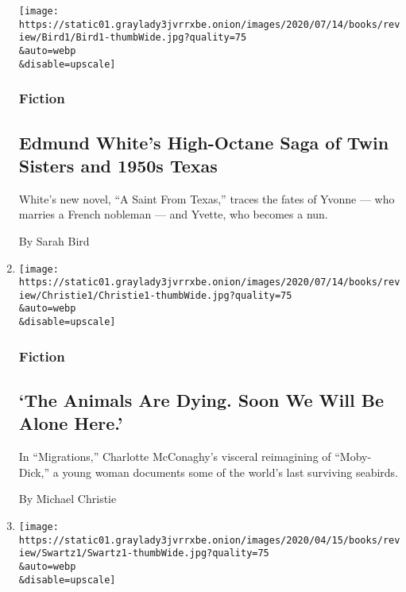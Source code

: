 \begin{enumerate}
  \texttt{[image: https://static01.graylady3jvrrxbe.onion/images/2020/07/14/books/review/Bird1/Bird1-thumbWide.jpg?quality=75\\\&auto=webp\\\&disable=upscale]}

  \hypertarget{fiction-1}{%
  \subsubsection{Fiction}\label{fiction-1}}

  \hypertarget{edmund-whites-high-octane-saga-of-twin-sisters-and-1950s-texas}{%
  \subsection{Edmund White's High-Octane Saga of Twin Sisters and 1950s
  Texas}\label{edmund-whites-high-octane-saga-of-twin-sisters-and-1950s-texas}}

  White's new novel, ``A Saint From Texas,'' traces the fates of Yvonne
  --- who marries a French nobleman --- and Yvette, who becomes a nun.

  By Sarah Bird
\item
  \href{/2020/08/04/books/review/migrations-charlotte-mcconaghy.html}{}

  \texttt{[image: https://static01.graylady3jvrrxbe.onion/images/2020/07/14/books/review/Christie1/Christie1-thumbWide.jpg?quality=75\\\&auto=webp\\\&disable=upscale]}

  \hypertarget{fiction-2}{%
  \subsubsection{Fiction}\label{fiction-2}}

  \hypertarget{the-animals-are-dying-soon-we-will-be-alone-here}{%
  \subsection{`The Animals Are Dying. Soon We Will Be Alone
  Here.'}\label{the-animals-are-dying-soon-we-will-be-alone-here}}

  In ``Migrations,'' Charlotte McConaghy's visceral reimagining of
  ``Moby-Dick,'' a young woman documents some of the world's last
  surviving seabirds.

  By Michael Christie
\item
  \href{/2020/08/04/books/review/after-the-last-border-jessica-goudeau.html}{}

  \texttt{[image: https://static01.graylady3jvrrxbe.onion/images/2020/04/15/books/review/Swartz1/Swartz1-thumbWide.jpg?quality=75\\\&auto=webp\\\&disable=upscale]}


\end{enumerate}

